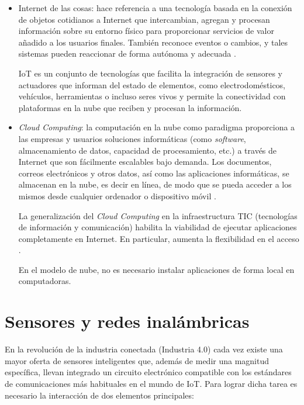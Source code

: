 \begin{itemize}
\item Internet de las cosas: hace referencia a una tecnología basada en la conexión de objetos cotidianos a Internet que intercambian, agregan y procesan información sobre su entorno físico para proporcionar servicios de valor añadido a los usuarios finales. También reconoce eventos o cambios, y tales sistemas pueden reaccionar de forma autónoma y adecuada \citep{BOOK:1}.

IoT es un conjunto de tecnologías que facilita la integración de sensores y actuadores que informan del estado de elementos, como electrodomésticos, vehículos, herramientas o incluso seres vivos y permite la conectividad con plataformas en la nube que reciben y procesan la información.

\item \emph{Cloud Computing}: la computación en la nube como paradigma proporciona a las empresas y usuarios soluciones informáticas (como \emph{software}, almacenamiento de datos, capacidad de procesamiento, etc.) a través de Internet que son fácilmente escalables bajo demanda. Los documentos, correos electrónicos y otros datos, así como las aplicaciones informáticas, se almacenan en la nube, es decir en línea, de modo que se pueda acceder a los mismos desde cualquier ordenador o dispositivo móvil \citep{BOOK:1}.

La generalización del \emph{Cloud Computing} en la infraestructura TIC (tecnologías de información y comunicación) habilita la viabilidad de ejecutar aplicaciones completamente en Internet. En particular, aumenta la flexibilidad en el acceso \citep{BOOK:1}.


En el modelo de nube, no es necesario instalar aplicaciones de forma local en computadoras.

\end{itemize}

\section{Sensores y redes inalámbricas}

En la revolución de la industria conectada (Industria 4.0) \citep{WEBSITE:31}  cada vez existe una mayor oferta de sensores inteligentes que, además de medir una magnitud específica, llevan integrado un circuito electrónico compatible con los estándares de comunicaciones más habituales en el mundo de IoT. Para lograr dicha tarea es necesario la interacción de dos elementos principales:

